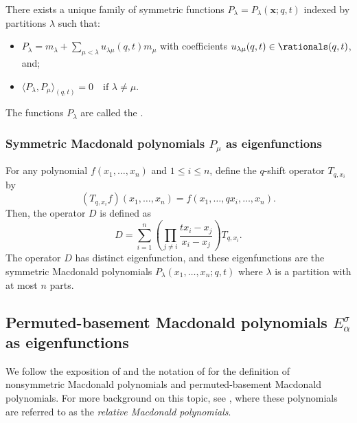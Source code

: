 \begin{theorem}
	There exists a unique family of symmetric functions \(P_\lambda = P_\lambda(\mathbf{x}; q, t)\) indexed by partitions \(\lambda\) such that:
	\begin{itemize}
	\item \( P_\lambda = m_\lambda + \sum_{\mu < \lambda} u_{\lambda\mu}(q, t) m_\mu \) with coefficients \( u_{\lambda\mu}(q, t) \in \rationals(q, t) \), and;
	\item \( \langle P_\lambda, P_\mu \rangle_{(q, t)} = 0 \quad \text{if } \lambda \ne \mu \).
	\end{itemize}
\end{theorem}

The functions \(P_\lambda\) are called the .

\subsubsection{Symmetric Macdonald polynomials \texorpdfstring{\(P_\mu\)}{Pμ} as eigenfunctions}

\cite{Mac88} 

For any polynomial \( f(x_1, \ldots, x_n) \) and \(1 \le i \le n\), define the \(q\)-shift operator \(T_{q,x_i}\) by
\begin{equation}
(T_{q,x_i} f)(x_1, \ldots, x_n) = f(x_1, \ldots, qx_i, \ldots, x_n).
\end{equation}
Then, the operator \( D \) is defined as
\begin{equation}
D = \sum_{i=1}^n \left( \prod_{j \ne i} \frac{t x_i - x_j}{x_i - x_j} \right) T_{q,x_i}.
\end{equation}
The operator \(D\) has distinct eigenfunction, and these eigenfunctions are the symmetric Macdonald polynomials \(P_\lambda(x_1, \ldots, x_n; q, t)\) where \(\lambda\) is a partition with at most \(n\) parts.

\subsection{Permuted-basement Macdonald polynomials \texorpdfstring{\(E_\alpha^\sigma\)}{Eασ} as eigenfunctions}
\label{sec:permuted basement def}

We follow the exposition of \cite{Fer11} and the notation of \cite{Ale19}
for the definition of nonsymmetric Macdonald polynomials
and permuted-basement Macdonald polynomials.
For more background on this topic, see \cite{GR22},
where these polynomials are referred to as the \emph{relative Macdonald polynomials}.

